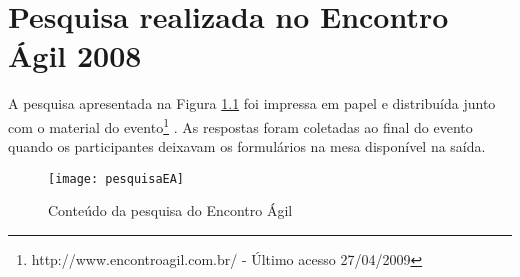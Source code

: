\chapter{Pesquisa realizada no Encontro Ágil 2008}
\label{ape:EA}

A pesquisa apresentada na Figura \ref{fig:pesquisaEA} foi impressa em
papel e distribuída junto com o material do
evento\footnote{http://www.encontroagil.com.br/ - Último acesso
  27/04/2009} . As respostas foram coletadas ao final do evento quando
os participantes deixavam os formulários na mesa disponível na saída.

\begin{figure}[th]
  \centering
  \texttt{[image: pesquisaEA]}
  \caption{Conteúdo da pesquisa do Encontro Ágil}
  \label{fig:pesquisaEA}
\end{figure}